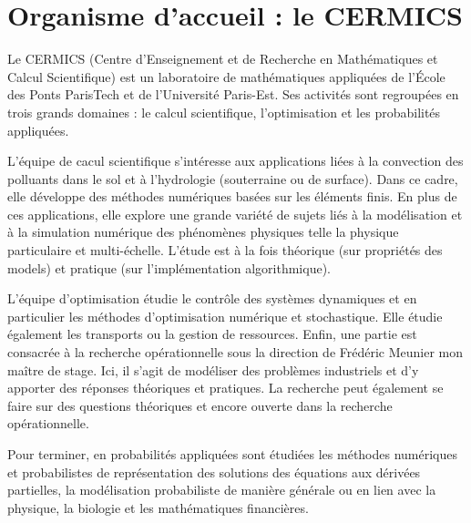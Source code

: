 \chapter*{Organisme d'accueil : le CERMICS}

Le CERMICS (Centre d'Enseignement et de Recherche en Mathématiques et Calcul Scientifique) est un laboratoire de mathématiques appliquées de l'\'Ecole des Ponts ParisTech et de l'Université Paris-Est. Ses activités sont regroupées en trois grands domaines : le calcul scientifique, l'optimisation et les probabilités appliquées.

L'équipe de cacul scientifique s'intéresse aux applications liées à la convection des polluants dans le sol et à l'hydrologie (souterraine ou de surface). Dans ce cadre, elle développe des méthodes numériques basées sur les éléments finis. En plus de ces applications, elle explore une grande variété de sujets liés à la modélisation et à la simulation numérique des phénomènes physiques telle la physique particulaire et multi-échelle. L'étude est à la fois théorique (sur propriétés des models) et pratique (sur l'implémentation algorithmique).

L'équipe d'optimisation étudie le contrôle des systèmes dynamiques et en particulier les méthodes d'optimisation numérique et stochastique. Elle étudie également les transports ou la gestion de ressources. Enfin, une partie est consacrée à la recherche opérationnelle sous la direction de Frédéric Meunier mon maître de stage. Ici, il s'agit de modéliser des problèmes industriels et d'y apporter des réponses théoriques et pratiques. La recherche peut également se faire sur des questions théoriques et encore ouverte dans la recherche opérationnelle.

Pour terminer, en probabilités appliquées sont étudiées les méthodes numériques et probabilistes de représentation des solutions des équations aux dérivées partielles, la modélisation probabiliste de manière générale ou en lien avec la physique, la biologie et les mathématiques financières.
